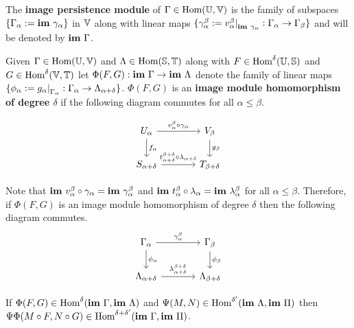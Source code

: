 The \textbf{image persistence module} of $\Gamma\in\text{Hom}(\mathbb{U},\mathbb{V})$ is the family of subspaces $\{\Gamma_\alpha :=\mathbf{im}~\gamma_\alpha\}$ in $\mathbb{V}$ along with linear maps $\{\gamma_\alpha^\beta := v_\alpha^\beta\mathord{\mid}_{\mathbf{im}~\gamma_\alpha} : \Gamma_\alpha\to\Gamma_\beta\}$ and will be denoted by $\mathbf{im}~\Gamma$.

Given $\Gamma\in\text{Hom}(\mathbb{U},\mathbb{V})$ and $\Lambda\in\text{Hom}(\mathbb{S},\mathbb{T})$ along with $F\in\text{Hom}^\delta(\mathbb{U},\mathbb{S})$ and $G\in\text{Hom}^\delta(\mathbb{V},\mathbb{T})$ let $\Phi(F, G) : \mathbf{im}~\Gamma\to\mathbf{im}~\Lambda$ denote the family of linear maps $\{\phi_\alpha := g_\alpha\mathord{\mid}_{\Gamma_\alpha} : \Gamma_\alpha\to\Lambda_{\alpha+\delta}\}$.
$\Phi(F, G)$ is an \textbf{image module homomorphism of degree $\delta$} if the following diagram commutes for all $\alpha\leq\beta$.

\begin{equation}\label{dgm:shifted_homomorphism}
  \begin{tikzcd}[column sep=large]
    U_\alpha\arrow{r}{v_\alpha^\beta\circ\gamma_\alpha}\arrow{d}{f_\alpha} &
    V_\beta\arrow{d}{g_\beta}\\
    S_{\alpha+\delta}\arrow{r}{t_{\alpha+\delta}^{\beta+\delta}\circ\lambda_{\alpha+\delta}} &
    T_{\beta +\delta}
\end{tikzcd}\end{equation}

Note that $\mathbf{im}~v_\alpha^\beta\circ\gamma_\alpha = \mathbf{im}~\gamma_\alpha^\beta$ and $\mathbf{im}~t_{\alpha}^{\beta}\circ\lambda_{\alpha} = \mathbf{im}~\lambda_\alpha^\beta$ for all $\alpha\leq\beta$.
Therefore, if $\Phi(F, G)$ is an image module homomorphism of degree $\delta$ then the following diagram commutes.
\begin{equation}\label{dgm:shifted_homomorphism}
  \begin{tikzcd}[column sep=large]
    \Gamma_\alpha\arrow{r}{\gamma_\alpha^\beta}\arrow{d}{\phi_\alpha} &
    \Gamma_\beta\arrow{d}{\phi_\beta}\\
    \Lambda_{\alpha+\delta}\arrow{r}{\lambda_{\alpha+\delta}^{\beta+\delta}} &
    \Lambda_{\beta +\delta}
\end{tikzcd}\end{equation}

\begin{lemma}\label{lem:composition}
  If $\Phi(F, G)\in\text{Hom}^\delta(\mathbf{im}~\Gamma, \mathbf{im}~\Lambda)$ and $\Psi(M, N)\in\text{Hom}^{\delta'}(\mathbf{im}~\Lambda, \mathbf{im}~\Pi)$ then $\Psi\Phi(M\circ F, N\circ G)\in\text{Hom}^{\delta+\delta'}(\mathbf{im}~\Gamma,\mathbf{im}~\Pi)$.
\end{lemma}
%

